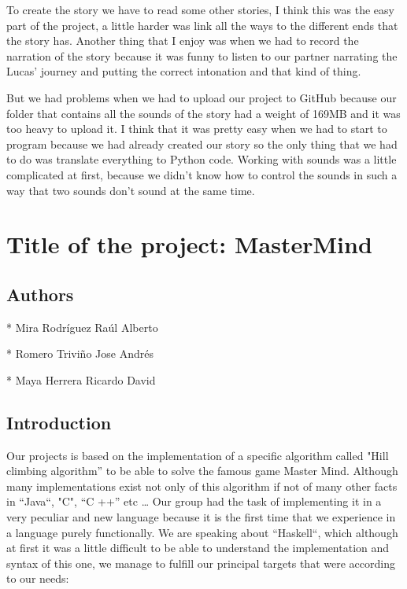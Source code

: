 \documentclass[12pt,letterpaper]{article}
\begin{document}
\begin{raggedleft}
To create the story we have to read some other stories, I think this was the easy part of the project, a little harder was link all the ways to the different ends that the story has.
Another thing that I enjoy was when we had to record the narration of the story because it was funny to listen to our partner narrating the Lucas’ journey and putting the correct intonation and that kind of thing.
\end{raggedleft}

\begin{raggedleft}
But we had problems when we had to upload our project to GitHub because our folder that contains all the sounds of the story had a weight of 169MB and it was too heavy to upload it.
I think that it was pretty easy when we had to start to program because we had already created our story so the only thing that we had to do was translate everything to Python code.
Working with sounds was a little complicated at first, because we didn’t know how to control the sounds in such a way that two sounds don’t sound at the same time.
\end{raggedleft}

\newpage

\section{Title of the project: MasterMind}
 
\subsection{Authors}

* Mira Rodríguez Raúl Alberto

* Romero Triviño Jose Andrés

* Maya Herrera Ricardo David

\subsection{Introduction}
\begin{raggedleft}
Our projects is based on the implementation of a specific algorithm called "Hill climbing algorithm” to be able to solve the famous game Master Mind.
Although many implementations exist not only of this algorithm if not of many other facts in “Java“, "C", “C ++” etc … Our group had the task of implementing it in a very peculiar and new language because it is the first time that we experience in a language purely functionally. We are speaking about “Haskell“, which although at first it was a little difficult to be able to understand the implementation and syntax of this one, we manage to fulfill our principal targets that were according to our needs:
\end{raggedleft}
\end{document}
